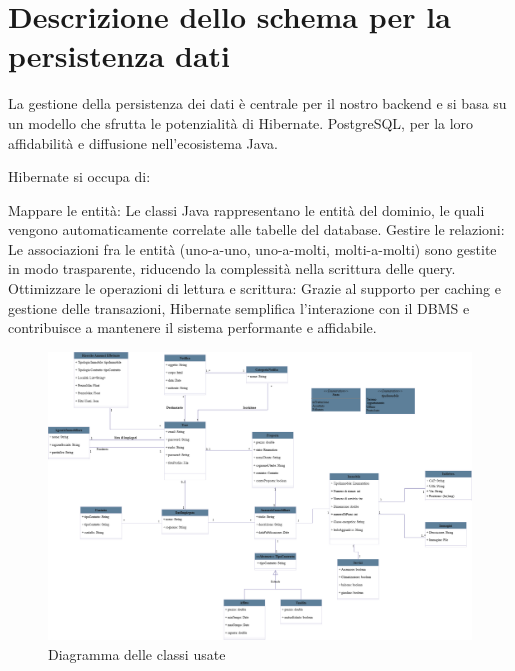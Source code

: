 \section{Descrizione dello schema per la persistenza dati}
La gestione della persistenza dei dati è centrale per il nostro backend e si basa su un modello che sfrutta le potenzialità di Hibernate.  PostgreSQL, per la loro affidabilità e diffusione nell’ecosistema Java.

Hibernate si occupa di:

Mappare le entità: Le classi Java rappresentano le entità del dominio, le quali vengono automaticamente correlate alle tabelle del database.
Gestire le relazioni: Le associazioni fra le entità (uno-a-uno, uno-a-molti, molti-a-molti) sono gestite in modo trasparente, riducendo la complessità nella scrittura delle query.
Ottimizzare le operazioni di lettura e scrittura: Grazie al supporto per caching e gestione delle transazioni, Hibernate semplifica l’interazione con il DBMS e contribuisce a mantenere il sistema performante e affidabile.
\newpage
\begin{figure}
	\centering
	\includegraphics[width=1
	\linewidth]{Immagini/diagramma delle classi.drawio.png}
	\caption{Diagramma delle classi usate}
	\label{fig:enter-label}
\end{figure}
